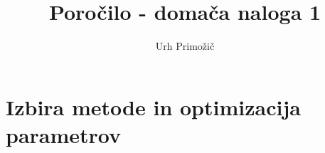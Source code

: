 \documentclass{article}
\begin{document}
\title{Poročilo - domača naloga 1}
\author{Urh Primožič}
\maketitle
\section{Izbira metode in optimizacija parametrov}
\end{document}
